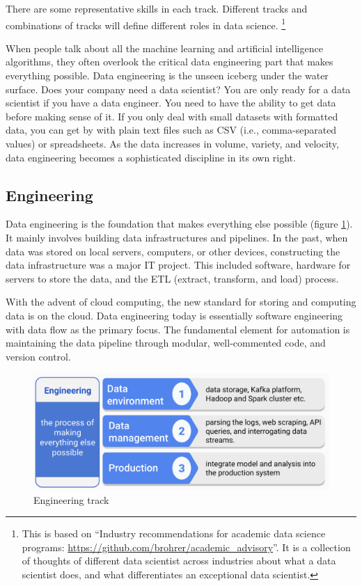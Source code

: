 \documentclass[
  12pt,
]{krantz}
\begin{document}
There are some representative skills in each track. Different tracks and combinations of tracks will define different roles in data science. \footnote{This is based on ``Industry recommendations for academic data science programs: \url{https://github.com/brohrer/academic_advisory}''. It is a collection of thoughts of different data scientist across industries about what a data scientist does, and what differentiates an exceptional data scientist.}

When people talk about all the machine learning and artificial intelligence algorithms, they often overlook the critical data engineering part that makes everything possible. Data engineering is the unseen iceberg under the water surface. Does your company need a data scientist? You are only ready for a data scientist if you have a data engineer. You need to have the ability to get data before making sense of it. If you only deal with small datasets with formatted data, you can get by with plain text files such as CSV (i.e., comma-separated values) or spreadsheets. As the data increases in volume, variety, and velocity, data engineering becomes a sophisticated discipline in its own right.

\hypertarget{engineering}{%
\subsection{Engineering}\label{engineering}}

Data engineering is the foundation that makes everything else possible (figure \ref{fig:track1engineering}). It mainly involves building data infrastructures and pipelines. In the past, when data was stored on local servers, computers, or other devices, constructing the data infrastructure was a major IT project. This included software, hardware for servers to store the data, and the ETL  (extract, transform, and load) process.

With the advent of cloud computing, the new standard for storing and computing data is on the cloud. Data engineering today is essentially software engineering with data flow as the primary focus. The fundamental element for automation is maintaining the data pipeline through modular, well-commented code, and version control.

\begin{figure}

{\centering \includegraphics[width=0.8\linewidth]{images/track1_engineering} 

}

\caption{Engineering track}\label{fig:track1engineering}
\end{figure}
\end{document}
